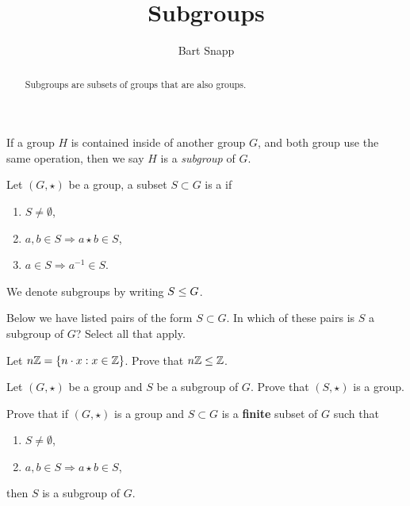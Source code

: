 \documentclass{ximera}
\author{Bart Snapp}
\title{Subgroups}
\begin{document}
\begin{abstract}
  Subgroups are subsets of groups that are also groups. 
\end{abstract}
\maketitle


If a group $H$ is contained inside of another group $G$, and both
group use the same operation, then we say $H$ is a \textit{subgroup}
of $G$.




\begin{definition}
  Let $(G,\star)$ be a group, a subset $S\subset G$ is a  if
  \begin{enumerate}
  \item $S \ne \emptyset$,
  \item $a,b\in S \Rightarrow a\star b\in S$,
  \item $a\in S \Rightarrow a^{-1}\in S$.
  \end{enumerate}
  We denote subgroups by writing $S\leq G$.
\end{definition}


\begin{exercise}
  Below we have listed pairs of the form $S\subset G$. In which of
  these pairs is $S$ a subgroup of $G$?  Select all that apply.
  \begin{selectAll}
  \end{selectAll}
\end{exercise}




\begin{exercise}
  Let $n\mathbb Z = \{n\cdot x : x\in \mathbb Z\}$. Prove that $n\mathbb Z\leq \mathbb Z$.
\end{exercise}


\begin{exercise}
  Let $(G,\star)$ be a group and $S$ be a subgroup of $G$. Prove that
  $(S,\star)$ is a group.
\end{exercise}

\begin{exercise}
  Prove that if $(G,\star)$ is a group and $S\subset G$ is a \textbf{finite}
  subset of $G$ such that
  \begin{enumerate}
  \item $S \ne \emptyset$,
  \item $a,b\in S \Rightarrow a\star b\in S$,
  \end{enumerate}
  then $S$ is a subgroup of $G$.
\end{exercise}
\end{document}

